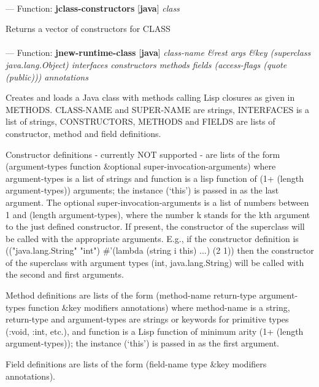\paragraph{}
\label{JAVA:JCLASS-CONSTRUCTORS}
--- Function: \textbf{jclass-constructors} [\textbf{java}] \textit{class}

\begin{adjustwidth}{5em}{5em}
Returns a vector of constructors for CLASS
\end{adjustwidth}

\paragraph{}
\label{JAVA:JNEW-RUNTIME-CLASS}
--- Function: \textbf{jnew-runtime-class} [\textbf{java}] \textit{class-name \&rest args \&key (superclass java.lang.Object) interfaces constructors methods fields (access-flags (quote (public))) annotations}

\begin{adjustwidth}{5em}{5em}
Creates and loads a Java class with methods calling Lisp closures
   as given in METHODS.  CLASS-NAME and SUPER-NAME are strings,
   INTERFACES is a list of strings, CONSTRUCTORS, METHODS and FIELDS are
   lists of constructor, method and field definitions.

   Constructor definitions - currently NOT supported - are lists of the form
   (argument-types function \&optional super-invocation-arguments)
   where argument-types is a list of strings and function is a lisp function of
   (1+ (length argument-types)) arguments; the instance (`this') is passed in as
   the last argument. The optional super-invocation-arguments is a list of numbers
   between 1 and (length argument-types), where the number k stands for the kth argument
   to the just defined constructor. If present, the constructor of the superclass
   will be called with the appropriate arguments. E.g., if the constructor definition is
   (("java.lang.String" "int") \#'(lambda (string i this) ...) (2 1))
   then the constructor of the superclass with argument types (int, java.lang.String) will
   be called with the second and first arguments.

   Method definitions are lists of the form
   (method-name return-type argument-types function \&key modifiers annotations)
   where method-name is a string, return-type and argument-types are strings or keywords for
   primitive types (:void, :int, etc.), and function is a Lisp function of minimum arity
   (1+ (length argument-types)); the instance (`this') is passed in as the first argument.

   Field definitions are lists of the form (field-name type \&key modifiers annotations).
\end{adjustwidth}

